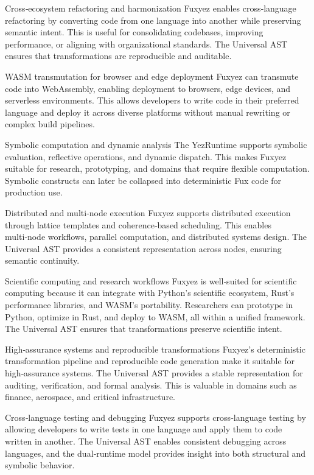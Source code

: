 Cross‑ecosystem refactoring and harmonization
Fuxyez enables cross‑language refactoring by converting code from one language into another while preserving semantic intent. This is useful for consolidating codebases, improving performance, or aligning with organizational standards. The Universal AST ensures that transformations are reproducible and auditable.

WASM transmutation for browser and edge deployment
Fuxyez can transmute code into WebAssembly, enabling deployment to browsers, edge devices, and serverless environments. This allows developers to write code in their preferred language and deploy it across diverse platforms without manual rewriting or complex build pipelines.

Symbolic computation and dynamic analysis
The YezRuntime supports symbolic evaluation, reflective operations, and dynamic dispatch. This makes Fuxyez suitable for research, prototyping, and domains that require flexible computation. Symbolic constructs can later be collapsed into deterministic Fux code for production use.

Distributed and multi‑node execution
Fuxyez supports distributed execution through lattice templates and coherence‑based scheduling. This enables multi‑node workflows, parallel computation, and distributed systems design. The Universal AST provides a consistent representation across nodes, ensuring semantic continuity.

Scientific computing and research workflows
Fuxyez is well‑suited for scientific computing because it can integrate with Python’s scientific ecosystem, Rust’s performance libraries, and WASM’s portability. Researchers can prototype in Python, optimize in Rust, and deploy to WASM, all within a unified framework. The Universal AST ensures that transformations preserve scientific intent.

High‑assurance systems and reproducible transformations
Fuxyez’s deterministic transformation pipeline and reproducible code generation make it suitable for high‑assurance systems. The Universal AST provides a stable representation for auditing, verification, and formal analysis. This is valuable in domains such as finance, aerospace, and critical infrastructure.

Cross‑language testing and debugging
Fuxyez supports cross‑language testing by allowing developers to write tests in one language and apply them to code written in another. The Universal AST enables consistent debugging across languages, and the dual‑runtime model provides insight into both structural and symbolic behavior.

